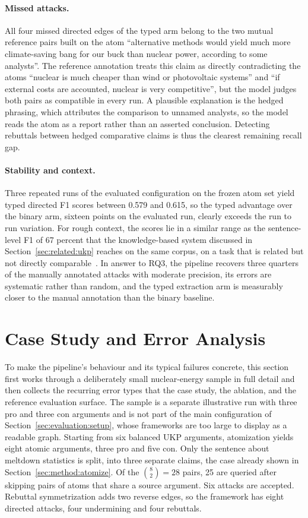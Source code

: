 \paragraph{Missed attacks.}
All four missed directed edges of the typed arm belong to the two mutual reference
pairs built on the atom ``alternative methods would yield much more
climate-saving bang for our buck than nuclear power, according to some
analysts''. The reference annotation treats this claim as directly contradicting
the atoms ``nuclear is much cheaper than wind or photovoltaic systems'' and
``if external costs are accounted, nuclear is very competitive'', but the
model judges both pairs as compatible in every run. A plausible explanation is
the hedged phrasing, which attributes the comparison to unnamed analysts, so
the model reads the atom as a report rather than an asserted conclusion.
Detecting rebuttals between hedged comparative claims is thus the clearest
remaining recall gap.

\paragraph{Stability and context.}
Three repeated runs of the evaluated configuration on the frozen atom set yield
typed directed F1 scores between 0.579 and 0.615, so the typed advantage over
the binary arm, sixteen points on the evaluated run, clearly exceeds the run to
run variation. For rough context, the scores lie in a similar range as the
sentence-level F1 of 67 percent that the knowledge-based system discussed in
Section~\ref{sec:related:ukp} reaches on the same corpus, on a task that is
related but not directly comparable~\cite{abels2021}. In answer to RQ3, the pipeline
recovers three quarters of the manually annotated attacks with moderate
precision, its errors are systematic rather than random, and the typed
extraction arm is measurably closer to the manual annotation than the binary
baseline.

\section{Case Study and Error Analysis}
\label{sec:evaluation:case}
\label{sec:evaluation:errors}

To make the pipeline's behaviour and its typical failures concrete, this
section first works through a deliberately small nuclear-energy sample in full
detail and then collects the recurring error types that the case study, the
ablation, and the reference evaluation surface. The sample is a separate illustrative run
with three pro and three con arguments and is not part of the main
configuration of Section~\ref{sec:evaluation:setup}, whose frameworks are too
large to display as a readable graph. Starting from six balanced UKP arguments,
atomization yields eight atomic arguments, three pro and five con. Only the
sentence about meltdown statistics is split, into three separate claims, the
case already shown in Section~\ref{sec:method:atomize}. Of the
$\binom{8}{2} = 28$ pairs, 25 are queried after skipping pairs of atoms that
share a source argument. Six attacks are accepted. Rebuttal symmetrization adds
two reverse edges, so the framework has eight directed attacks, four
undermining and four rebuttals.

